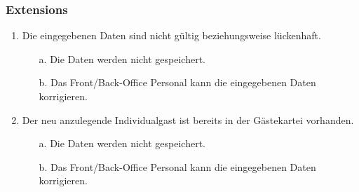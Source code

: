 \documentclass[./detailed_overview_usecases.tex]{subfiles}
\begin{document}
    \subsubsection*{Extensions}
    \begin{enumerate}
        \item Die eingegebenen Daten sind nicht gültig beziehungsweise lückenhaft.
        \begin{itemize}
                       \item[a.] Die Daten werden nicht gespeichert.
                       \item[b.] Das Front/Back-Office Personal kann die eingegebenen Daten korrigieren.
        \end{itemize}
        \item Der neu anzulegende Individualgast ist bereits in der Gästekartei vorhanden.
        \begin{itemize}
            \item[a.] Die Daten werden nicht gespeichert.
            \item[b.] Das Front/Back-Office Personal kann die eingegebenen Daten korrigieren.
        \end{itemize}
    \end{enumerate}
\end{document}
